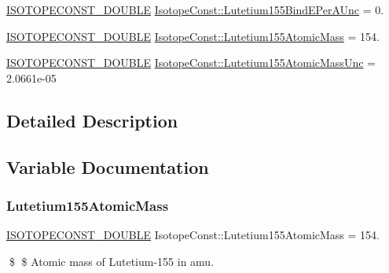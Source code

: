 \begin{DoxyCompactItemize}
\mbox{\hyperlink{group___isotope_const-_macros_ga8f45a7272ce02c0b4c65c44636ed719a}{I\+S\+O\+T\+O\+P\+E\+C\+O\+N\+S\+T\+\_\+\+D\+O\+U\+B\+LE}} \mbox{\hyperlink{group___isotope_const-_lutetium-_lu155_ga5ad50bbf6e53948ed4cc48cea1140dca}{Isotope\+Const\+::\+Lutetium155\+Bind\+E\+Per\+A\+Unc}} = 0.
\item 
\mbox{\hyperlink{group___isotope_const-_macros_ga8f45a7272ce02c0b4c65c44636ed719a}{I\+S\+O\+T\+O\+P\+E\+C\+O\+N\+S\+T\+\_\+\+D\+O\+U\+B\+LE}} \mbox{\hyperlink{group___isotope_const-_lutetium-_lu155_ga207b7fe35b071b777b5713458e6271e7}{Isotope\+Const\+::\+Lutetium155\+Atomic\+Mass}} = 154.
\item 
\mbox{\hyperlink{group___isotope_const-_macros_ga8f45a7272ce02c0b4c65c44636ed719a}{I\+S\+O\+T\+O\+P\+E\+C\+O\+N\+S\+T\+\_\+\+D\+O\+U\+B\+LE}} \mbox{\hyperlink{group___isotope_const-_lutetium-_lu155_gab537722b73ddd4ede04322066820b6ed}{Isotope\+Const\+::\+Lutetium155\+Atomic\+Mass\+Unc}} = 2.\+0661e-\/05
\end{DoxyCompactItemize}


\subsection{Detailed Description}


\subsection{Variable Documentation}
\mbox{\label{group___isotope_const-_lutetium-_lu155_ga207b7fe35b071b777b5713458e6271e7}} 
\subsubsection{\texorpdfstring{Lutetium155\+Atomic\+Mass}{Lutetium155AtomicMass}}
{\footnotesize\ttfamily \mbox{\hyperlink{group___isotope_const-_macros_ga8f45a7272ce02c0b4c65c44636ed719a}{I\+S\+O\+T\+O\+P\+E\+C\+O\+N\+S\+T\+\_\+\+D\+O\+U\+B\+LE}} Isotope\+Const\+::\+Lutetium155\+Atomic\+Mass = 154.}

\$ \$ Atomic mass of Lutetium-\/155 in amu. \mbox{\label{group___isotope_const-_lutetium-_lu155_gab537722b73ddd4ede04322066820b6ed}} 
